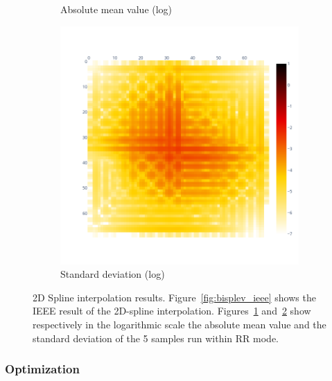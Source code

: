 \documentclass[11pt]{article}
\begin{document}
\begin{figure}
\begin{subfigure}{.3\textwidth}
    \caption{Absolute mean value (log)}
    \label{fig:bisplev_mean_log}
\end{subfigure}
\begin{subfigure}{.3\textwidth}
    \centering
    \includegraphics[width=\linewidth]{figure/spline_2d/bisplev_inputs_std_log.png}
    \caption{Standard deviation (log)}
    \label{fig:bisplev_std_log}
\end{subfigure}
    \caption{2D Spline interpolation results. Figure~\ref{fig:bisplev_ieee} shows the IEEE result
    of the 2D-spline interpolation. Figures~\ref{fig:bisplev_mean_log} and~\ref{fig:bisplev_std_log}
    show respectively in the logarithmic scale the absolute mean value and the standard deviation 
    of the 5 samples run within RR mode.}
    \label{fig:spline2d_rr}
\end{figure}


\subsubsection{Optimization}
\end{document}
